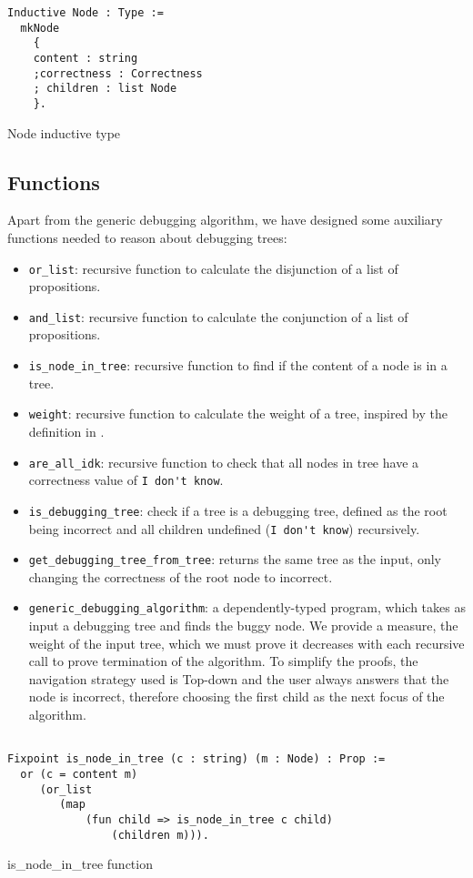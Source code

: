 \begin{listing}[!ht]
\begin{verbatim}
Inductive Node : Type :=
  mkNode
    {
    content : string
    ;correctness : Correctness
    ; children : list Node
    }.
\end{verbatim}
\caption{Node inductive type}
\label{listing:2}
\end{listing}

\subsection{Functions}
Apart from the generic debugging algorithm, we have designed some auxiliary functions needed to reason about debugging trees:

\begin{itemize}
\item \verb|or_list|: recursive function to calculate the disjunction of a list of propositions.
\item \verb|and_list|: recursive function to calculate the conjunction of a list of propositions.
\item \verb|is_node_in_tree|: recursive function to find if the content of a node is in a tree.
\item \verb|weight|: recursive function to calculate the weight of a tree, inspired by the definition in \cite{optimal_strategy}.
\item \verb|are_all_idk|: recursive function to check that all nodes in tree have a correctness value of \verb|I don't know|.
\item \verb|is_debugging_tree|: check if a tree is a debugging tree, defined as the root being incorrect and all children undefined (\verb|I don't know|) recursively.
\item \verb|get_debugging_tree_from_tree|: returns the same tree as the input, only changing the correctness of the root node to incorrect.
\item \verb|generic_debugging_algorithm|: a dependently-typed program, which takes as input a debugging tree and finds the buggy node. We provide a measure, the weight of the input tree, which we must prove it decreases with each recursive call to prove termination of the algorithm.
To simplify the proofs, the navigation strategy used is Top-down and the user always answers that the node is incorrect, therefore choosing the first child as the next focus of the algorithm.
\end{itemize}

\begin{listing}[!ht]
\begin{verbatim}

Fixpoint is_node_in_tree (c : string) (m : Node) : Prop :=
  or (c = content m)
     (or_list
        (map
            (fun child => is_node_in_tree c child)
                (children m))).

\end{verbatim}
\caption{is\_node\_in\_tree function}
\label{listing:3}
\end{listing}

